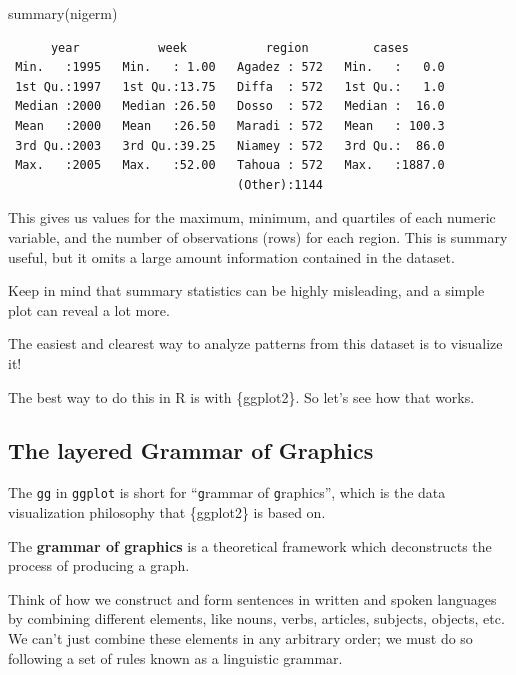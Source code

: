 \documentclass[
  letterpaper,
  DIV=11,
  numbers=noendperiod]{scrreprt}
\newenvironment{Shaded}{\begin{snugshade}}{\end{snugshade}}
\newcommand{\FunctionTok}[1]{\textcolor[rgb]{0.28,0.35,0.67}{#1}}
\newcommand{\NormalTok}[1]{\textcolor[rgb]{0.00,0.23,0.31}{#1}}
\begin{document}
\begin{Shaded}
\begin{Highlighting}[]
\FunctionTok{summary}\NormalTok{(nigerm)}
\end{Highlighting}
\end{Shaded}

\begin{verbatim}
      year           week           region         cases       
 Min.   :1995   Min.   : 1.00   Agadez : 572   Min.   :   0.0  
 1st Qu.:1997   1st Qu.:13.75   Diffa  : 572   1st Qu.:   1.0  
 Median :2000   Median :26.50   Dosso  : 572   Median :  16.0  
 Mean   :2000   Mean   :26.50   Maradi : 572   Mean   : 100.3  
 3rd Qu.:2003   3rd Qu.:39.25   Niamey : 572   3rd Qu.:  86.0  
 Max.   :2005   Max.   :52.00   Tahoua : 572   Max.   :1887.0  
                                (Other):1144                   
\end{verbatim}

This gives us values for the maximum, minimum, and quartiles of each
numeric variable, and the number of observations (rows) for each region.
This is summary useful, but it omits a large amount information
contained in the dataset.

Keep in mind that summary statistics can be highly misleading, and a
simple plot can reveal a lot more.

The easiest and clearest way to analyze patterns from this dataset is to
visualize it!

The best way to do this in R is with \{ggplot2\}. So let's see how that
works.

\subsection{The layered Grammar of
Graphics}\label{the-layered-grammar-of-graphics}

The \texttt{gg} in \texttt{ggplot} is short for ``\texttt{g}rammar of
\texttt{g}raphics'', which is the data visualization philosophy that
\{ggplot2\} is based on.

The \textbf{grammar of graphics} is a theoretical framework which
deconstructs the process of producing a graph.

Think of how we construct and form sentences in written and spoken
languages by combining different elements, like nouns, verbs, articles,
subjects, objects, etc. We can't just combine these elements in any
arbitrary order; we must do so following a set of rules known as a
linguistic grammar.
\end{document}
